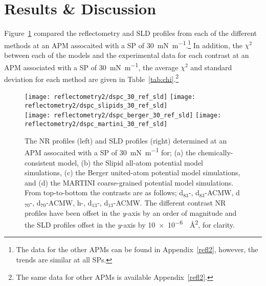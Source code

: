 \section{Results \& Discussion}
Figure~\ref{fig:dspcccref30} compared the reflectometry and SLD profiles from each of the different methods at an APM assocaited with a SP of \SI{30}{\milli\newton\per\meter}.\footnote{The data for the other APMs can be found in Appendix~\ref{refl2}, however, the trends are similar at all SPs.}
In addition, the $\chi^2$ between each of the models and the experimental data for each contrast at an APM associated with a SP of \SI{30}{\milli\newton\per\meter}, the average $\chi^2$ and standard deviation for each method are given in Table~\ref{tab:chi}.\footnote{The same data for other APMs is available Appendix~\ref{refl2}.}
%
\begin{figure}[t]
    \centering
    \texttt{[image: reflectometry2/dspc\_30\_ref\_sld]}
    \texttt{[image: reflectometry2/dspc\_slipids\_30\_ref\_sld]}\\
    \texttt{[image: reflectometry2/dspc\_berger\_30\_ref\_sld]}
    \texttt{[image: reflectometry2/dspc\_martini\_30\_ref\_sld]}
    \caption{The NR profiles (left) and SLD profiles (right) determined at an APM assocaited with a SP of \SI{30}{\milli\newton\per\meter} for; (a) the chemically-consistent model, (b) the Slipid all-atom potential model simulations, (c) the Berger united-atom potential model simulations, and (d) the MARTINI coarse-grained potential model simulations. From top-to-bottom the contrasts are as follows; d$_{83}$-, d$_{83}$-ACMW, d$_{70}$-, d$_{70}$-ACMW, h-, d$_{13}$-, d$_{13}$-ACMW. The different contrast NR profiles have been offset in the \emph{y}-axis by an order of magnitude and the SLD profiles offset in the \emph{y}-axis by \SI{10e-6}{\per\angstrom\squared}, for clarity.}
    \label{fig:dspcccref30}
\end{figure}
%
%
